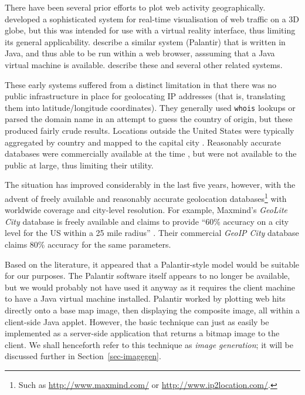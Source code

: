 \documentclass[acmtocl,acmnow]{acmtrans2m}
\begin{document}
There have been several prior efforts to plot web activity
geographically.  developed a sophisticated
system for real-time visualisation of web traffic on a 3D globe, but
this was intended for use with a virtual reality interface, thus
limiting its general applicability. 
describe a similar system (Palantir) that is written in Java, and thus
able to be run within a web browser, asssuming that a Java virtual
machine is available. 
describe these and several other related systems.

These early systems suffered from a distinct limitation in that there
was no public infrastructure in place for geolocating IP addresses (that
is, translating them into latitude/longitude coordinates). They
generally used \texttt{whois} lookups or parsed the domain name in an
attempt to guess the country of origin, but these produced fairly crude
results. Locations outside the United States were typically aggregated
by country and mapped to the capital city
\cite{Lamm-SE-1996-webvis,Papa-N-1998-Palantir,Jian-B-2000-cybermap}.
Reasonably accurate databases were commercially available at the time
\cite[p.\ 1466]{Lamm-SE-1996-webvis}, but were not available to the
public at large, thus limiting their utility.

The situation has improved considerably in the last five years, however,
with the advent of freely available and reasonably accurate geolocation
databases\footnote{Such as \url{http://www.maxmind.com/} or
\url{http://www.ip2location.com/}.} with worldwide coverage and
city-level resolution. For example, Maxmind's \emph{GeoLite City}
database is freely available and claims to provide ``60\% accuracy on a
city level for the US within a 25 mile radius''
\cite{Maxm-G-2006-GeoLiteCity}. Their commercial \emph{GeoIP City}
database claims 80\% accuracy for the same parameters.

Based on the literature, it appeared that a Palantir-style model would
be suitable for our purposes. The Palantir software itself appears to no
longer be available, but we would probably not have used it anyway as it
requires the client machine to have a Java virtual machine installed.
Palantir worked by plotting web hits directly onto a base map image,
then displaying the composite image, all within a client-side Java
applet. However, the basic technique can just as easily be implemented
as a server-side application that returns a bitmap image to the client.
We shall henceforth refer to this technique as \emph{image generation};
it will be discussed further in Section~\ref{sec-imagegen}.
\end{document}
